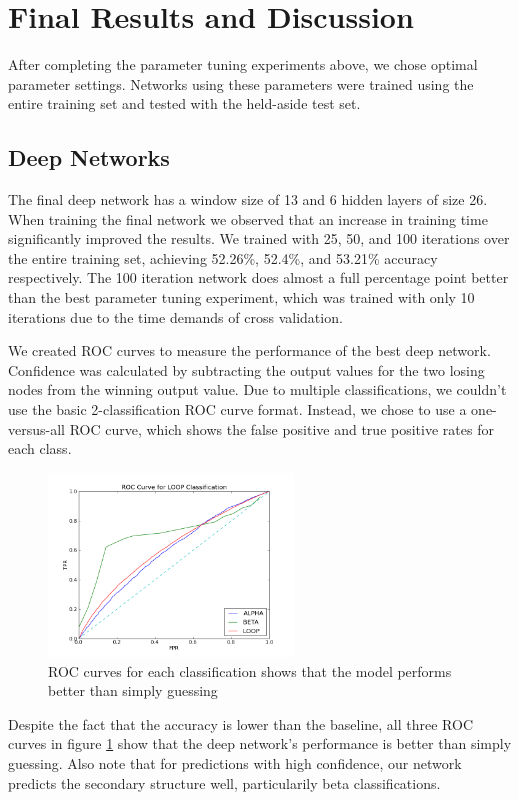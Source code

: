 \documentclass[letterpaper,twocolumn,12pt]{article}
\begin{document}
\section{Final Results and Discussion}
After completing the parameter tuning experiments above, we chose optimal parameter settings.
Networks using these parameters were trained using the entire training set and tested with the held-aside test set.

\subsection{Deep Networks}
The final deep network has a window size of 13 and 6 hidden layers of size 26.
When training the final network we observed that an increase in training time significantly improved the results. 
We trained with 25, 50, and 100 iterations over the entire training set, achieving 52.26\%, 52.4\%, and 53.21\% accuracy respectively.
The 100 iteration network does almost a full percentage point better than the best parameter tuning experiment, which was trained with only 10 iterations due to the time demands of cross validation.

We created ROC curves to measure the performance of the best deep network.
Confidence was calculated by subtracting the output values for the two losing nodes from the winning output value.
Due to multiple classifications, we couldn't use the basic 2-classification ROC curve format.
Instead, we chose to use a one-versus-all ROC curve, which shows the false positive and true positive rates for each class.

\begin{figure}[ht!]
\centering
\includegraphics[width=65mm]{results/ROC_all_final_deep_net_100it.png}
\caption{ROC curves for each classification shows that the model performs better than simply guessing}
\label{fig:roc}
\end{figure}

Despite the fact that the accuracy is lower than the baseline, all three ROC curves in figure \ref{fig:roc} show that the deep network's performance is better than simply guessing.
Also note that for predictions with high confidence, our network predicts the secondary structure well, particularily beta classifications.
\end{document}
